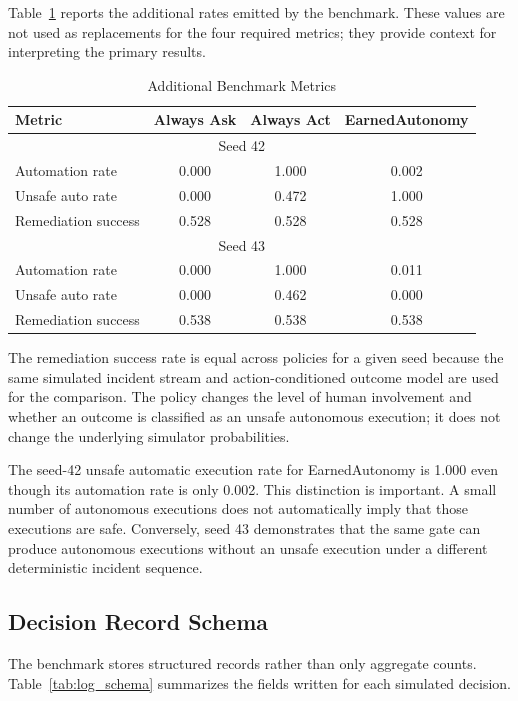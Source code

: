 \documentclass[conference]{IEEEtran}
\begin{document}
Table~\ref{tab:additional_metrics} reports the additional rates emitted by the
benchmark. These values are not used as replacements for the four required
metrics; they provide context for interpreting the primary results.

\begin{table}[htbp]
\centering
\caption{Additional Benchmark Metrics}
\label{tab:additional_metrics}
\begin{tabular}{lccc}
\toprule
Metric & Always Ask & Always Act & EarnedAutonomy\\
\midrule
\multicolumn{4}{c}{Seed 42}\\
\midrule
Automation rate & 0.000 & 1.000 & 0.002\\
Unsafe auto rate & 0.000 & 0.472 & 1.000\\
Remediation success & 0.528 & 0.528 & 0.528\\
\midrule
\multicolumn{4}{c}{Seed 43}\\
\midrule
Automation rate & 0.000 & 1.000 & 0.011\\
Unsafe auto rate & 0.000 & 0.462 & 0.000\\
Remediation success & 0.538 & 0.538 & 0.538\\
\bottomrule
\end{tabular}
\end{table}

The remediation success rate is equal across policies for a given seed because
the same simulated incident stream and action-conditioned outcome model are
used for the comparison. The policy changes the level of human involvement and
whether an outcome is classified as an unsafe autonomous execution; it does
not change the underlying simulator probabilities.

The seed-42 unsafe automatic execution rate for EarnedAutonomy is 1.000 even
though its automation rate is only 0.002. This distinction is important. A
small number of autonomous executions does not automatically imply that those
executions are safe. Conversely, seed 43 demonstrates that the same gate can
produce autonomous executions without an unsafe execution under a different
deterministic incident sequence.

\subsection{Decision Record Schema}
The benchmark stores structured records rather than only aggregate counts.
Table~\ref{tab:log_schema} summarizes the fields written for each simulated
decision.
\end{document}
